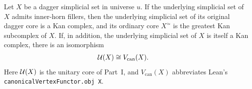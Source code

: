 \begin{resultblock}
\begin{theorem}
Let $X$ be a dagger simplicial set in universe $u$.
If the underlying simplicial set of $X$ admits inner-horn fillers, then the underlying simplicial set of its original dagger core is a Kan complex, and its ordinary core $X^{\simeq}$ is the greatest Kan subcomplex of $X$.
If, in addition, the underlying simplicial set of $X$ is itself a Kan complex, there is an isomorphism
\begin{align}
  \mathcal{U}(X)&\cong V_{\mathrm{can}}(X).
\end{align}
Here $\mathcal{U}(X)$ is the unitary core of Part~I, and $V_{\mathrm{can}}(X)$ abbreviates Lean's \nolinkurl{canonicalVertexFunctor.obj X}.
\end{theorem}
\end{resultblock}

